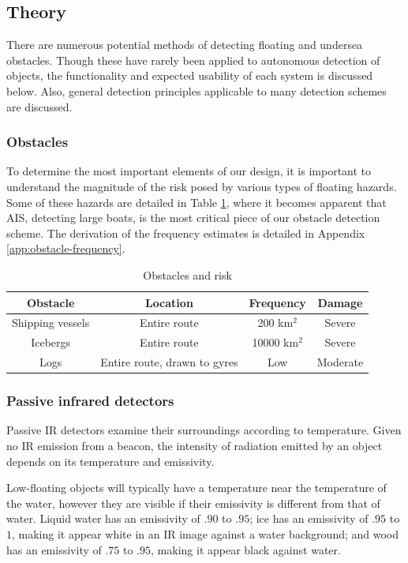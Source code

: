 \subsection{\label{sec:method:theory}Theory}
There are numerous potential methods of detecting floating and undersea obstacles. Though these have rarely been applied to autonomous detection of objects, the functionality and expected usability of each system is discussed below. Also, general detection principles applicable to many detection schemes are discussed.

\subsubsection{\label{sec:method:theory:obstacles}Obstacles}
To determine the most important elements of our design, it is important to understand the magnitude of the risk posed by various types of floating hazards. Some of these hazards are detailed in Table \ref{tab:obstacles}, where it becomes apparent that AIS, detecting large boats, is the most critical piece of our obstacle detection scheme. The derivation of the frequency estimates is detailed in Appendix \ref{app:obstacle-frequency}.

\begin{table}
\caption{\label{tab:obstacles}Obstacles and risk}
\begin{tabular}{c|c|c|c}

Obstacle & Location & Frequency & Damage\\[0.6cm]
\hline

Shipping vessels & Entire route &200 km$^2$ & Severe \\
Icebergs & Entire route & 10000 km$^2$ & Severe \\
Logs & Entire route, drawn to gyres & Low & Moderate \\

\end{tabular}
\end{table}

\subsubsection{\label{sec:method:passive-infrared-detectors}Passive infrared detectors}
Passive IR detectors examine their surroundings according to temperature. Given no IR emission from a beacon, the intensity of radiation emitted by an object depends on its temperature and emissivity.

Low-floating objects will typically have a temperature near the temperature of the water, however they are visible if their emissivity is different from that of water. Liquid water has an emissivity of $.90$ to $.95$; ice has an emissivity of $.95$ to $1$, making it appear white in an IR image against a water background; and wood has an emissivity of $.75$ to $.95$, making it appear black against water. \cite{optotherm-emisstable}


